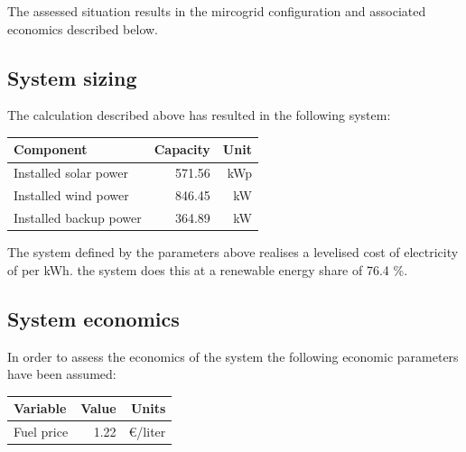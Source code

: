\documentclass{article}[11pt]
\begin{document}
\begin{multicols}{2}
The assessed situation results in the mircogrid configuration and associated economics described below.

\subsection*{System sizing}

The calculation described above has resulted in the following system:

{\color{black}\begin{flushleft}

\begin{tabular}{|l|r|r|}

\hline Component&Capacity&Unit\\ \hline 

Installed solar power&571.56&kWp\\ 

Installed wind power&846.45&kW\\ 

Installed backup power&364.89&kW\\ 

\hline

\end{tabular}

\label{tab:systemlayout}

\end{flushleft}}\vspace{0.5mm}

The system defined by the parameters above realises a levelised cost of electricity of  per kWh. the system does this at a renewable energy share of 76.4 \%. 

\subsection*{System economics}

In order to assess the economics of the system the following economic parameters have been assumed: 

{\color{black}\begin{flushleft}

\begin{tabular}{|l|r|r|}

\hline Variable&Value&Units\\ \hline 

Fuel price&1.22&\euro /liter\\ 


\end{tabular}
\end{flushleft}}
\end{multicols}
\end{document}
